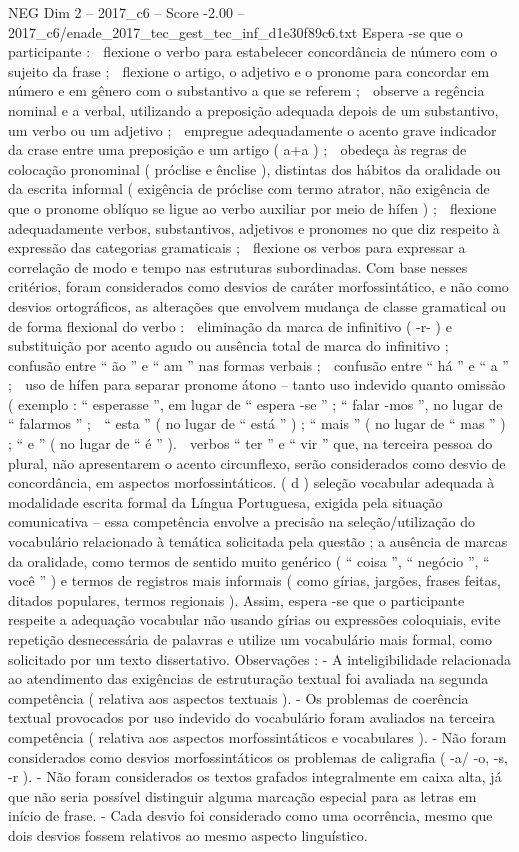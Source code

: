 \begin{textsample}{NEG Dim 2 – 2017\_c6 – Score -2.00 – 2017\_c6/enade\_2017\_tec\_gest\_tec\_inf\_d1e30f89c6.txt}
Espera -se que o participante :  flexione o verbo para estabelecer concordância de número com o sujeito da frase ;  flexione o artigo, o adjetivo e o pronome para concordar em número e em gênero com o substantivo a que se referem ;  observe a regência nominal e a verbal, utilizando a preposição adequada depois de um substantivo, um verbo ou um adjetivo ;  empregue adequadamente o acento grave indicador da crase entre uma preposição e um artigo ( a+a ) ;  obedeça às regras de colocação pronominal ( próclise e ênclise ), distintas dos hábitos da oralidade ou da escrita informal ( exigência de próclise com termo atrator, não exigência de que o pronome oblíquo se ligue ao verbo auxiliar por meio de hífen ) ;  flexione adequadamente verbos, substantivos, adjetivos e pronomes no que diz respeito à expressão das categorias gramaticais ;  flexione os verbos para expressar a correlação de modo e tempo nas estruturas subordinadas.
Com base nesses critérios, foram considerados como desvios de caráter morfossintático, e não como desvios ortográficos, as alterações que envolvem mudança de classe gramatical ou de forma flexional do verbo :  eliminação da marca de infinitivo ( -r- ) e substituição por acento agudo ou ausência total de marca do infinitivo ;  confusão entre “ ão ” e “ am ” nas formas verbais ;  confusão entre “ há ” e “ a ” ;  uso de hífen para separar pronome átono – tanto uso indevido quanto omissão ( exemplo : “ esperasse ”, em lugar de “ espera -se ” ; “ falar -mos ”, no lugar de “ falarmos ” ;  “ esta ” ( no lugar de “ está ” ) ; “ mais ” ( no lugar de “ mas ” ) ; “ e ” ( no lugar de “ é ” ).  verbos “ ter ” e “ vir ” que, na terceira pessoa do plural, não apresentarem o acento circunflexo, serão considerados como desvio de concordância, em aspectos morfossintáticos. ( d ) seleção vocabular adequada à modalidade escrita formal da Língua Portuguesa, exigida pela situação comunicativa – essa competência envolve a precisão na seleção/utilização do vocabulário relacionado à temática solicitada pela questão ; a ausência de marcas da oralidade, como termos de sentido muito genérico ( “ coisa ”, “ negócio ”, “ você ” ) e termos de registros mais informais ( como gírias, jargões, frases feitas, ditados populares, termos regionais ).
Assim, espera -se que o participante respeite a adequação vocabular não usando gírias ou expressões coloquiais, evite repetição desnecessária de palavras e utilize um vocabulário mais formal, como solicitado por um texto dissertativo.
Observações : - A inteligibilidade relacionada ao atendimento das exigências de estruturação textual foi avaliada na segunda competência ( relativa aos aspectos textuais ). - Os problemas de coerência textual provocados por uso indevido do vocabulário foram avaliados na terceira competência ( relativa aos aspectos morfossintáticos e vocabulares ). - Não foram considerados como desvios morfossintáticos os problemas de caligrafia ( -a/ -o, -s, -r ). - Não foram considerados os textos grafados integralmente em caixa alta, já que não seria possível distinguir alguma marcação especial para as letras em início de frase. - Cada desvio foi considerado como uma ocorrência, mesmo que dois desvios fossem relativos ao mesmo aspecto linguístico.

\end{textsample}
